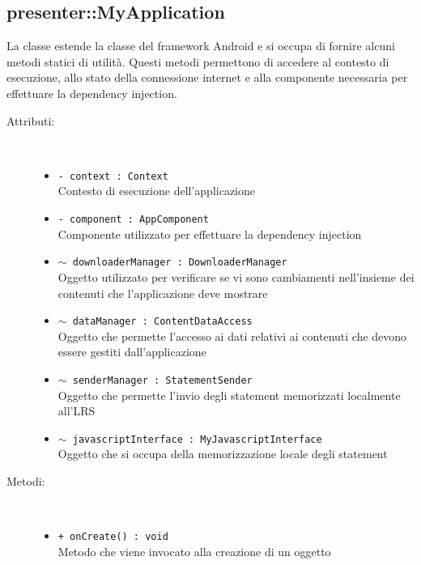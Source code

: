 \documentclass[../Tesi.tex]{subfiles}
\begin{document}
		\subsection{presenter::MyApplication}
		La classe  estende la classe  del framework Android e si occupa di fornire alcuni metodi statici di utilità. Questi metodi permettono di accedere al contesto di esecuzione, allo stato della connessione internet e alla componente necessaria per effettuare la dependency injection.
		\begin{description}
			\item[Attributi:] \
			\begin{itemize}
				\item \texttt{- context : Context}\\
				Contesto di esecuzione dell'applicazione

				\item \texttt{- component : AppComponent}\\
				Componente utilizzato per effettuare la dependency injection

				\item \texttt{$\sim$ downloaderManager : DownloaderManager}\\
				Oggetto utilizzato per verificare se vi sono cambiamenti nell'insieme dei contenuti che l'applicazione deve mostrare

				\item \texttt{$\sim$ dataManager : ContentDataAccess}\\
				Oggetto che permette l'accesso ai dati relativi ai contenuti che devono essere gestiti dall'applicazione

				\item \texttt{$\sim$ senderManager : StatementSender}\\
				Oggetto che permette l'invio degli statement memorizzati localmente all'LRS

				\item \texttt{$\sim$ javascriptInterface : MyJavascriptInterface}\\
				Oggetto che si occupa della memorizzazione locale degli statement
			\end{itemize}

			\item[Metodi:] \
			\begin{itemize}
				\item \texttt{+ onCreate() : void}\\
				Metodo che viene invocato alla creazione di un oggetto 
				

\end{itemize}
\end{description}
\end{document}
